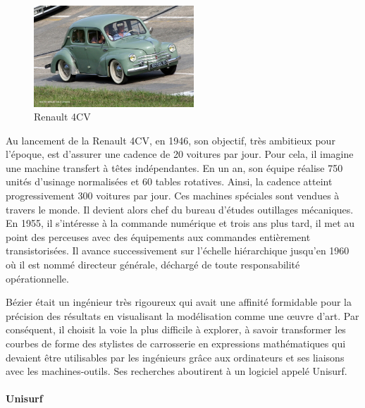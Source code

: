 \documentclass{article}
\begin{document}
\begin{figure}[h]
	\centering
	\includegraphics[width=6cm]{renault_4.jpg}
	\caption{Renault 4CV}
\end{figure}

\indent	
	Au lancement de la Renault 4CV, en 1946, son objectif, tr\`{e}s ambitieux pour l'\'{e}poque, est d'assurer une cadence de 20 voitures par jour. Pour cela, il imagine une machine transfert \`{a} t\^{e}tes ind\'{e}pendantes. En un an, son \'{e}quipe r\'{e}alise 750 unit\'{e}s d'usinage normalis\'{e}es et 60 tables rotatives. Ainsi, la cadence atteint progressivement 300 voitures par jour. Ces machines sp\'{e}ciales sont vendues \`{a} travers le monde. Il devient alors chef du bureau d'\'{e}tudes outillages m\'{e}caniques. En 1955, il s'int\'{e}resse \`{a} la commande num\'{e}rique et trois ans plus tard, il met au point des perceuses avec des \'{e}quipements aux commandes enti\`{e}rement transistoris\'{e}es. Il avance successivement sur l'\'{e}chelle hi\'{e}rarchique jusqu'en 1960 o\`{u} il est nomm\'{e} directeur g\'{e}n\'{e}rale, d\'{e}charg\'{e} de toute responsabilit\'{e} op\'{e}rationnelle.
\par
B\'{e}zier \'{e}tait un ing\'{e}nieur tr\`{e}s rigoureux qui avait une affinit\'{e} formidable pour la pr\'{e}cision des r\'{e}sultats en visualisant la mod\'{e}lisation comme une \oe{}uvre d'art. Par cons\'{e}quent, il choisit la voie la plus difficile \`{a} explorer, \`{a} savoir transformer les courbes de forme des stylistes de carrosserie en expressions math\'{e}matiques qui devaient \^{e}tre utilisables par les ing\'{e}nieurs gr\^{a}ce aux ordinateurs et ses liaisons avec les machines-outils. Ses recherches aboutirent \`{a} un logiciel appel\'{e} Unisurf. 
\\\\
\textbf{Unisurf}\\
\end{document}
